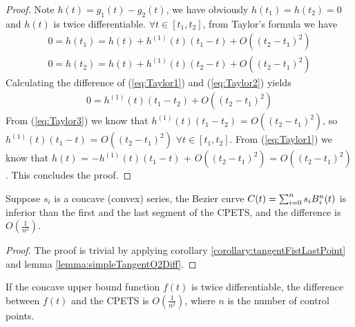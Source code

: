 \begin{proof}
Note $h(t) = g_{1}(t) - g_{2}(t)$, we have obviously $h(t_{1}) = h(t_{2})=0$ and $h(t)$ is twice differentiable. $\forall t \in \left[t_{1}, t_{2}\right]$, from Taylor's formula we have
{
\setlength\abovedisplayskip{1pt}
\setlength\belowdisplayskip{1pt}
\begin{equation}\begin{split}
0=h(t_{1}) = h(t) + h^{(1)}(t)(t_{1} - t) + O((t_{2}-t_{1})^{2})
\label{eq:Taylor1}
\end{split}\end{equation}
}
{
\setlength\abovedisplayskip{1pt}
\setlength\belowdisplayskip{1pt}
\begin{equation}\begin{split}
0=h(t_{2}) = h(t) + h^{(1)}(t)(t_{2} - t) + O((t_{2}-t_{1})^{2})
\label{eq:Taylor2}
\end{split}\end{equation}
}
Calculating the difference of (\ref{eq:Taylor1}) and (\ref{eq:Taylor2}) yields
{
\setlength\abovedisplayskip{1pt}
\setlength\belowdisplayskip{1pt}
\begin{equation}\begin{split}
0=h^{(1)}(t)(t_{1}-t_{2})+O((t_{2}-t_{1})^{2})
\label{eq:Taylor3}
\end{split}\end{equation}
}
From (\ref{eq:Taylor3}) we know that $h^{(1)}(t)(t_{1}-t_{2})$ = $O((t_{2}-t_{1})^{2})$, so $h^{(1)}(t)(t_{1} - t)$ = $O((t_{2}-t_{1})^{2})$ $\forall t \in \left[t_{1}, t_{2}\right]$. From (\ref{eq:Taylor1}) we know that $h(t)$ = $-h^{(1)}(t)(t_{1} - t)$ + $O((t_{2}-t_{1})^{2})$ = $O((t_{2}-t_{1})^{2})$. This concludes the proof.
\end{proof}

\begin{corollary}
Suppose $s_{i}$ is a concave (convex) series, the Bezier curve $C(t)=\sum_{i=0}^{n}s_{i}B\textsupsub{$n$}{$i$}(t)$ is inferior than the first and the last segment of the CPETS, and the difference is $O(\frac{1}{n^{2}})$.
\label{corollary:tangentFistLastPointDiff}
\end{corollary}

\begin{proof}
The proof is trivial by applying corollary \ref{corollary:tangentFistLastPoint} and lemma \ref{lemma:simpleTangentO2Diff}.
\end{proof}

\begin{corollary}
If the concave upper bound function $f(t)$ is twice differentiable, the difference between $f(t)$ and the CPETS is $O(\frac{1}{n^{2}})$, where $n$ is the number of control points.
\label{corollary:diffUpperBoundCPETS}
\end{corollary}

